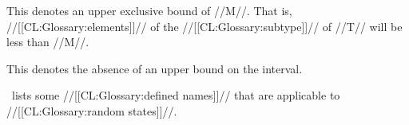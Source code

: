 
This denotes an upper exclusive bound of //M//.  That is, //[[CL:Glossary:elements]]//
of the //[[CL:Glossary:subtype]]// of //T// will be less than //M//.


This denotes the absence of an upper bound on the interval.

\endlist

\endsubsection%


\Thenextfigure\ lists some //[[CL:Glossary:defined names]]// that are applicable to //[[CL:Glossary:random states]]//.


\endsubsection%
